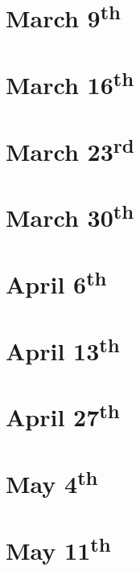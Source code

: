 \newpage
\section[March 9th]{March 9\textsuperscript{th}}
\label{app:mar09}

\newpage
\section[March 16th]{March 16\textsuperscript{th}}
\label{app:mar16}

\newpage
\section[March 23rd]{March 23\textsuperscript{rd}}
\label{app:mar23}

\newpage
\section[March 30th]{March 30\textsuperscript{th}}
\label{app:mar30}

\newpage
\section[April 6th]{April 6\textsuperscript{th}}
\label{app:apr06}

\newpage
\section[April 13th]{April 13\textsuperscript{th}}
\label{app:apr13}

\newpage
\section[April 27th]{April 27\textsuperscript{th}}
\label{app:apr27}

\newpage
\section[May 4th]{May 4\textsuperscript{th}}
\label{app:may04}

\newpage
\section[May 11th]{May 11\textsuperscript{th}}
\label{app:may11}

